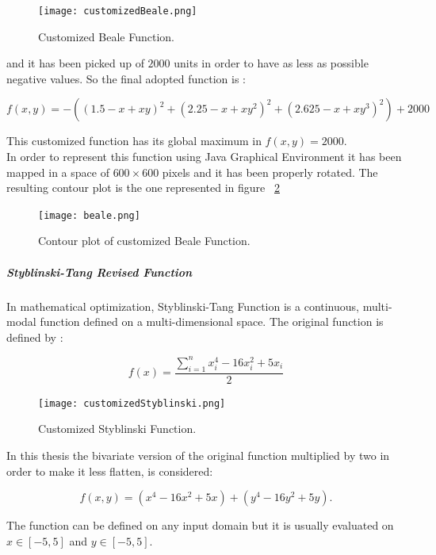 \begin{figure}[h!]
	\centering
	\texttt{[image: customizedBeale.png]}
	\caption{Customized Beale Function.}
	\label{fig:CustomizedBealeFunction}
\end{figure}

and it has been picked up of $2000$ units in order to have as less as possible negative values. So the final adopted function is :

\begin{equation}
f(x, y) = -((1.5 - x + xy)^2 + (2.25 - x + xy^2)^2 + (2.625 - x + xy^3)^2) + 2000
\end{equation}

This customized function has its global maximum in $f(x, y) = 2000$. \\

In order to represent this function using Java Graphical Environment it has been mapped in a space of $600 \times 600$ pixels and it has been properly rotated. The resulting contour plot is the one represented in figure ~\ref{fig:ContourPlotCustomizedBealeFunction} 

\begin{figure}[h!]
	\centering
	\texttt{[image: beale.png]}
	\caption{Contour plot of customized Beale Function.}
	\label{fig:ContourPlotCustomizedBealeFunction}
\end{figure}

\subparagraph{Styblinski-Tang Revised Function} In mathematical optimization, Styblinski-Tang Function is a continuous, multi-modal function defined on a multi-dimensional space. The original function is defined by :

\begin{equation}
	f(x) = \dfrac{\sum_{i=1}^{n} x_{i}^4 -16x_{i}^2 +5x_{i}}{2}
\end{equation}

\begin{figure}[h!]
	\centering
	\texttt{[image: customizedStyblinski.png]}
	\caption{Customized Styblinski Function.}
	\label{fig:CustomizedStyblinskiFunction}
\end{figure}

In this thesis the bivariate version of the original function multiplied by two in order to make it less flatten, is considered:

\begin{equation}
f(x, y) = (x^4 - 16x^2 + 5x) + (y^4 - 16y^2 + 5y).
\end{equation}

The function can be defined on any input domain but it is usually evaluated on $x \in [-5, 5]$ and $y \in [-5, 5]$. \\


